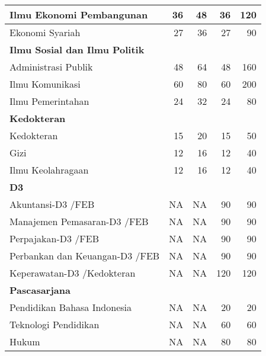\documentclass[
]{book}
\begin{document}
\begin{table}[H]
{\begin{tabular}{l|r|r|r|r}
\hline
\hspace{1em}Ilmu Ekonomi Pembangunan & 36 & 48 & 36 & 120\\
\hline
\hspace{1em}Ekonomi Syariah & 27 & 36 & 27 & 90\\
\hline
\multicolumn{5}{l}{\textbf{Ilmu Sosial dan Ilmu Politik}}\\
\hline
\hspace{1em}Administrasi Publik & 48 & 64 & 48 & 160\\
\hline
\hspace{1em}Ilmu Komunikasi & 60 & 80 & 60 & 200\\
\hline
\hspace{1em}Ilmu Pemerintahan & 24 & 32 & 24 & 80\\
\hline
\multicolumn{5}{l}{\textbf{Kedokteran}}\\
\hline
\hspace{1em}Kedokteran & 15 & 20 & 15 & 50\\
\hline
\hspace{1em}Gizi & 12 & 16 & 12 & 40\\
\hline
\hspace{1em}Ilmu Keolahragaan & 12 & 16 & 12 & 40\\
\hline
\multicolumn{5}{l}{\textbf{D3}}\\
\hline
\hspace{1em}Akuntansi-D3 /FEB & NA & NA & 90 & 90\\
\hline
\hspace{1em}Manajemen Pemasaran-D3 /FEB & NA & NA & 90 & 90\\
\hline
\hspace{1em}Perpajakan-D3 /FEB & NA & NA & 90 & 90\\
\hline
\hspace{1em}Perbankan dan Keuangan-D3 /FEB & NA & NA & 90 & 90\\
\hline
\hspace{1em}Keperawatan-D3 /Kedokteran & NA & NA & 120 & 120\\
\hline
\multicolumn{5}{l}{\textbf{Pascasarjana}}\\
\hline
\hspace{1em}Pendidikan Bahasa Indonesia & NA & NA & 20 & 20\\
\hline
\hspace{1em}Teknologi Pendidikan & NA & NA & 60 & 60\\
\hline
\hspace{1em}Hukum & NA & NA & 80 & 80\\

\end{tabular}}
\end{table}
\end{document}
